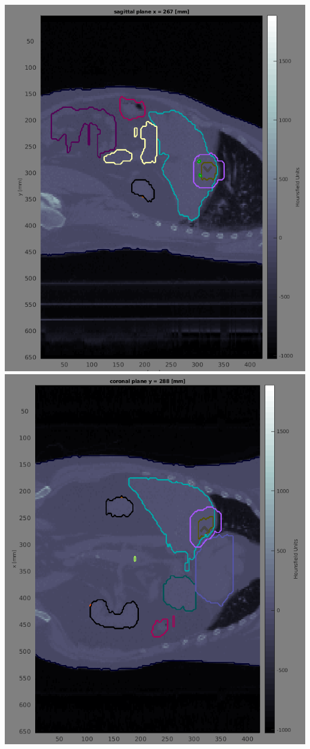 \documentclass[a4paper,12pt,notitlepage]{article}	%
\begin{document}
\begin{questions}
\begin{reponse}
	\includegraphics[height=.2\textheight]{./Figures/LiverSagittal} \quad
	\includegraphics[height=.2\textheight]{./Figures/LiverCoronal} 
  

\end{reponse}
\end{questions}
\end{document}
